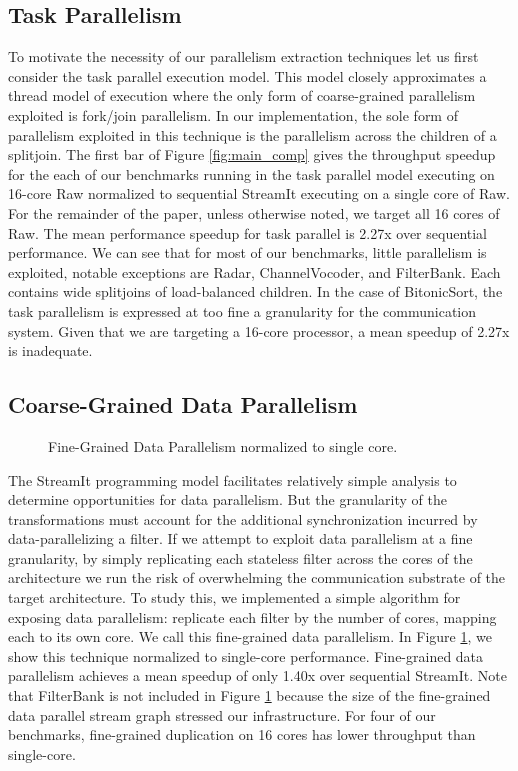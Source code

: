 \subsection{Task Parallelism}
To motivate the necessity of our parallelism extraction techniques let
us first consider the task parallel execution model.  This model
closely approximates a thread model of execution where the only form
of coarse-grained parallelism exploited is fork/join parallelism.  In
our implementation, the sole form of parallelism exploited in this
technique is the parallelism across the children of a splitjoin. The
first bar of Figure \ref{fig:main_comp} gives the throughput speedup
for the each of our benchmarks running in the task parallel model
executing on 16-core Raw normalized to sequential StreamIt executing
on a single core of Raw.  For the remainder of the paper,
unless otherwise noted, we target all 16 cores of Raw.  The 
mean performance speedup for task parallel is 2.27x over sequential
performance. We can see that for most of our benchmarks, little
parallelism is exploited, notable exceptions are Radar,
ChannelVocoder, and FilterBank.  Each contains wide splitjoins of
load-balanced children.  In the case of BitonicSort, the task
parallelism is expressed at too fine a granularity for the
communication system.  Given that we are targeting a 16-core
processor, a mean speedup of 2.27x is inadequate.

\subsection{Coarse-Grained Data Parallelism}
\begin{figure}[t]
\centering
{}
\caption{Fine-Grained Data Parallelism normalized to single core.
\protect\label{fig:fine_data}}
\vspace{-6pt}
\end{figure}
The StreamIt programming model facilitates relatively simple analysis
to determine opportunities for data parallelism.  But the granularity
of the transformations must account for the additional synchronization
incurred by data-parallelizing a filter.  If we attempt to exploit
data parallelism at a fine granularity, by simply replicating each
stateless filter across the cores of the architecture we run the risk
of overwhelming the communication substrate of the target
architecture.  To study this, we implemented a simple algorithm for
exposing data parallelism: replicate each filter by the number of
cores, mapping each to its own core.  We call this fine-grained data
parallelism.  In Figure \ref{fig:fine_data}, we show this technique
normalized to single-core performance.  Fine-grained data parallelism
achieves a mean speedup of only 1.40x over sequential StreamIt.  Note
that FilterBank is not included in Figure \ref{fig:fine_data} because
the size of the fine-grained data parallel stream graph stressed our
infrastructure.  For four of our benchmarks, fine-grained duplication
on 16 cores has lower throughput than single-core.

